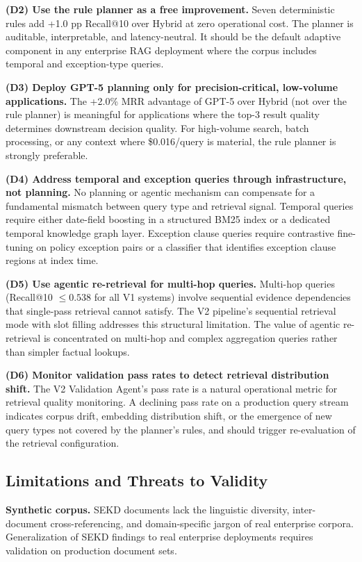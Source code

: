 \documentclass[11pt, a4paper]{article}
\begin{document}
\textbf{(D2) Use the rule planner as a free improvement.} Seven deterministic rules add +1.0 pp Recall@10 over Hybrid at zero operational cost. The planner is auditable, interpretable, and latency-neutral. It should be the default adaptive component in any enterprise RAG deployment where the corpus includes temporal and exception-type queries.

\textbf{(D3) Deploy GPT-5 planning only for precision-critical, low-volume applications.} The +2.0\% MRR advantage of GPT-5 over Hybrid (not over the rule planner) is meaningful for applications where the top-3 result quality determines downstream decision quality. For high-volume search, batch processing, or any context where \$0.016/query is material, the rule planner is strongly preferable.

\textbf{(D4) Address temporal and exception queries through infrastructure, not planning.} No planning or agentic mechanism can compensate for a fundamental mismatch between query type and retrieval signal. Temporal queries require either date-field boosting in a structured BM25 index or a dedicated temporal knowledge graph layer. Exception clause queries require contrastive fine-tuning on policy exception pairs or a classifier that identifies exception clause regions at index time.

\textbf{(D5) Use agentic re-retrieval for multi-hop queries.} Multi-hop queries (Recall@10 $\leq 0.538$ for all V1 systems) involve sequential evidence dependencies that single-pass retrieval cannot satisfy. The V2 pipeline's sequential retrieval mode with slot filling addresses this structural limitation. The value of agentic re-retrieval is concentrated on multi-hop and complex aggregation queries rather than simpler factual lookups.

\textbf{(D6) Monitor validation pass rates to detect retrieval distribution shift.} The V2 Validation Agent's pass rate is a natural operational metric for retrieval quality monitoring. A declining pass rate on a production query stream indicates corpus drift, embedding distribution shift, or the emergence of new query types not covered by the planner's rules, and should trigger re-evaluation of the retrieval configuration.

\subsection{Limitations and Threats to Validity}

\textbf{Synthetic corpus.} SEKD documents lack the linguistic diversity, inter-document cross-referencing, and domain-specific jargon of real enterprise corpora. Generalization of SEKD findings to real enterprise deployments requires validation on production document sets.
\end{document}
